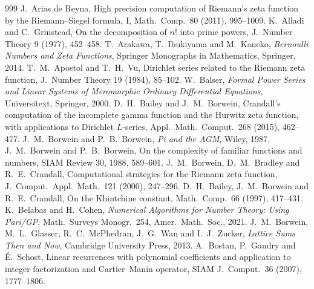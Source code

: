 \documentclass[11pt,reqno]{amsart}
\theoremstyle{definition}
\theoremstyle{remark}
\begin{document}
\begin{thebibliography}{999}
 J.~Arias de Reyna, High precision computation of Riemann's zeta function by the Riemann--Siegel formula, I, Math.\ Comp.\ 80 (2011), 995--1009.
 K.~Alladi and C.~Grinstead, On the decomposition of $n!$ into prime powers, J.\ Number Theory 9 (1977), 452--458.
 T.~Arakawa, T.~Ibukiyama and M.~Kaneko, \emph{Bernoulli Numbers and Zeta Functions}, Springer
Monographs in Mathematics, Springer, 2014.
 T.~M.~Apostol and T.~H.~Vu, Dirichlet series related to the Riemann zeta function, J.\ Number Theory 19 (1984), 85--102.
 W.~Balser, \emph{Formal Power Series and Linear Systems of Meromorphic Ordinary Differential Equations}, Universitext, Springer, 2000.
 D.~H.~Bailey and J.~M.~Borwein, Crandall's computation of the incomplete gamma function and the Hurwitz zeta function, with applications to Dirichlet $L$-series, Appl.\ Math.\ Comput.\ 268 (2015), 462--477.
 J.~M.~Borwein and P.~B.~Borwein, \emph{Pi and the AGM}, Wiley, 1987.
 J.~M.~Borwein and P.~B.~Borwein, On the complexity of familiar functions and numbers, SIAM Review 30, 1988, 589--601.
 J.~M.~Borwein, D.~M.~Bradley and R.~E.~Crandall, Computational strategies for the Riemann zeta function, J.\ Comput.\ Appl.\ Math.\ 121 (2000), 247--296.
 D.~H.~Bailey, J.~M.~Borwein and R.~E.~Crandall, On the Khintchine constant, Math.\ Comp.\ 66 (1997), 417--431.
 K.~Belabas and H.~Cohen, \emph{Numerical Algorithms for Number Theory: Using Pari/GP}, Math.\ Surveys Monogr.\ 254, Amer.\ Math.\ Soc., 2021.
 J.~M.~Borwein, M.~L.~Glasser, R.~C.~McPhedran, J.~G.~Wan and I.~J.~Zucker, \emph{Lattice Sums Then and Now}, Cambridge University Press, 2013.
 A.~Bostan, P.~Gaudry and \'E.~Schost, Linear recurrences with polynomial coefficients and application to integer factorization and Cartier--Manin operator, SIAM J.\ Comput.\ 36 (2007), 1777--1806.

\end{thebibliography}
\end{document}
